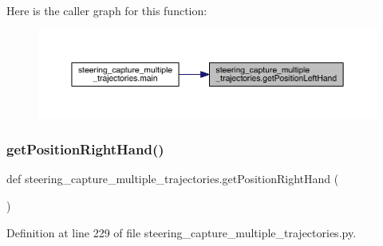 Here is the caller graph for this function\+:\nopagebreak
\begin{figure}[H]
\begin{center}
\leavevmode
\includegraphics[width=350pt]{namespacesteering__capture__multiple__trajectories_a95175c2c569ebc87d8635cd5ac111f9d_icgraph}
\end{center}
\end{figure}
\mbox{\label{namespacesteering__capture__multiple__trajectories_aabe5dd4b4636c49de9d19bc3e3af0fc0}} 
\subsubsection{\texorpdfstring{getPositionRightHand()}{getPositionRightHand()}}
{\footnotesize\ttfamily def steering\+\_\+capture\+\_\+multiple\+\_\+trajectories.\+get\+Position\+Right\+Hand (\begin{DoxyParamCaption}{ }\end{DoxyParamCaption})}



Definition at line 229 of file steering\+\_\+capture\+\_\+multiple\+\_\+trajectories.\+py.


